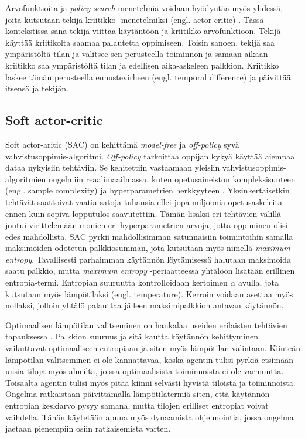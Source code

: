 \documentclass[utf8]{gradu3}
\begin{document}
Arvofunktioita ja \textit{policy search}-menetelmiä voidaan hyödyntää myös yhdessä, joita kutsutaan tekijä-kriitikko -menetelmiksi (engl. actor-critic) \parencite{arulkumaran2017brief}. Tässä kontekstissa sana tekijä viittaa käytäntöön ja kriitikko arvofunktioon. Tekijä käyttää kriitikolta saamaa palautetta oppimiseen. Toisin sanoen, tekijä saa ympäristöltä tilan ja valitsee sen perusteella toiminnon ja samaan aikaan kriitikko saa ympäristöltä tilan ja edellisen aika-askeleen palkkion. Kriitikko laskee tämän perusteella ennustevirheen (engl. temporal difference) ja päivittää itsensä ja tekijän.

\subsection{Soft actor-critic}

Soft actor-aritic (SAC) on \textcite{haarnoja2018soft} kehittämä \textit{model-free} ja \textit{off-policy} syvä vahvistusoppimis-algoritmi. \textit{Off-policy} tarkoittaa oppijan kykyä käyttää aiempaa dataa nykyisiin tehtäviin. Se kehitettiin vastaamaan yleisiin vahvistusoppimis-algoritmien ongelmiin reaalimaailmassa, kuten opetusaineiston kompleksisuuteen (engl. sample complexity) ja hyperparametrien herkkyyteen \parencite{haarnoja2018app}. Yksinkertaisetkin tehtävät saattoivat vaatia satoja tuhansia ellei jopa miljoonia opetusaskeleita ennen kuin sopiva lopputulos saavutettiin. Tämän lisäksi eri tehtävien välillä joutui virittelemään monien eri hyperparametrien arvoja, jotta oppiminen olisi edes mahdollista. SAC pyrkii mahdollisimman satunnaisiin toimintoihin samalla maksimoiden odotetun palkkiosumman, jota kutsutaan myös nimellä \textit{maximum entropy}. Tavallisesti parhaimman käytännön löytämisessä halutaan maksimoida saatu palkkio, mutta \textit{maximum entropy} -periaatteessa yhtälöön lisätään erillinen entropia-termi. Entropian suuruutta kontrolloidaan kertoimen $\alpha$ avulla, jota kutsutaan myös lämpötilaksi (engl. temperature). Kerroin voidaan asettaa myös nollaksi, jolloin yhtälö palauttaa jälleen maksimipalkkion antavan käytännön.

Optimaalisen lämpötilan valitseminen on hankalaa useiden erilaisten tehtävien tapauksessa \parencite{haarnoja2018app}. Palkkion suuruus ja sitä kautta käytännön kehittyminen vaikuttavat optimaaliseen entropiaan ja siten myös lämpötilan valintaan. Kiinteän lämpötilan valitseminen ei ole kannattavaa, koska agentin tulisi pyrkiä etsimään uusia tiloja myös alueilta, joissa optimaalisista toiminnoista ei ole varmuutta. Toisaalta agentin tulisi myös pitää kiinni selvästi hyvistä tiloista ja toiminnoista. Ongelma ratkaistaan päivittämällä lämpötilatermiä siten, että käytännön entropian keskiarvo pysyy samana, mutta tilojen erilliset entropiat voivat vaihdella. Tähän käytetään apuna myös dynaamista ohjelmointia, jossa ongelma jaetaan pienempiin osiin ratkaisemista varten.
\end{document}
